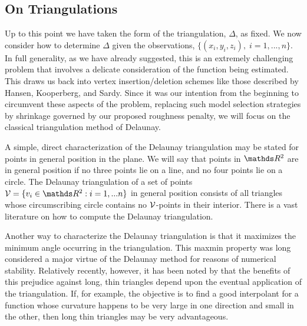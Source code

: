 \subsection{On Triangulations}

Up to this point we have taken the form of the triangulation, $\Delta$,
as fixed.  We now consider how to determine $\Delta$
given the observations, $\{ (x_i,y_i,z_i), \; i=1,...,n \}$.
In full generality, as we have already suggested,
this is an extremely challenging problem that involves
a delicate consideration of the function being estimated.  This draws us
back into vertex insertion/deletion schemes like those described by Hansen,
Kooperberg, and Sardy.  Since it was our intention from
the beginning to circumvent these
aspects of the problem, replacing such model selection strategies by
shrinkage governed by our proposed roughness penalty, we will focus on
the classical triangulation method of Delaunay.

A simple, direct characterization of the Delaunay triangulation may be stated for points in general
position in the plane.  We will say that points in $\RR^2$ are in general 
position if no three points lie on a line, and no four points lie on a circle.
The Delaunay triangulation of a set of points 
$\VV = \{ v_i \in \RR^2 :  i=1,...n \}$ in general
position consists of all triangles whose circumscribing circle contains
no $\mathcal{V}$-points in their interior.  
There is a vast literature on how to compute the Delaunay triangulation.  

Another way to characterize the Delaunay triangulation is that it maximizes
the minimum angle occurring in the triangulation.
This maxmin property was long considered a major
virtue of the Delaunay method for reasons of numerical stability.  
Relatively recently, however,  it has 
been noted by  that the benefits 
of this prejudice against long, thin triangles
depend upon the eventual application of the
triangulation.  If, for example, the objective is to find a good
interpolant for a function whose curvature happens to 
be  very large in one direction
and small in the other, then long thin triangles may be very 
advantageous.
  
